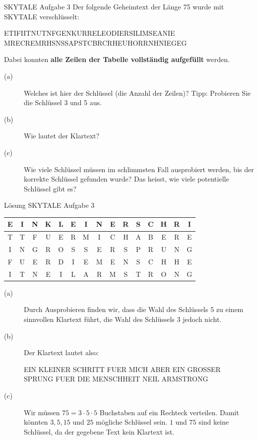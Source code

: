 \begin{frame}[label=skytaleEx3]{SKYTALE Aufgabe 3}
Der folgende Geheimtext der Länge 75 wurde mit SKYTALE verschlüsselt:
\begin{center}
ETIFIITNUTNFGENKURRELEODIERSILIMSEANIE\\
MRECREMRHSNSSAPSTCBRCRHEUHORRNHNIEGEG 
\end{center}
Dabei konnten \textbf{alle Zeilen der Tabelle vollständig aufgefüllt} werden.
\begin{description}
\item[(a)] Welches ist hier der Schlüssel (die Anzahl der Zeilen)? Tipp: Probieren Sie die Schlüssel 3 und 5 aus.
\item[(b)] Wie lautet der Klartext?
\item[(c)] Wie viele Schlüssel müssen im schlimmsten Fall ausprobiert werden, bis der korrekte Schlüssel gefunden wurde? Das heisst, wie viele potentielle Schlüssel gibt es?
\end{description}
\end{frame}

\begin{frame}[fragile, label=skytaleEx3Sol]{Lösung SKYTALE Aufgabe 3}
\begin{table}[]
\begin{tabular}{|c|c|c|c|c|c|c|c|c|c|c|c|c|c|c|}
\hline
E & I & N & K & L & E & I & N & E & R & S & C & H & R & I \\ \hline
T & T & F & U & E & R & M & I & C & H & A & B & E & R & E \\ \hline
I & N & G & R & O & S & S & E & R & S & P & R & U & N & G \\ \hline
F & U & E & R & D & I & E & M & E & N & S & C & H & H & E \\ \hline
I & T & N & E & I & L & A & R & M & S & T & R & O & N & G \\ \hline
\end{tabular}
\end{table}
\begin{description}
\item[(a)] Durch Ausprobieren finden wir, dass die Wahl des Schlüssels 5 zu einem sinnvollen Klartext führt, die Wahl des Schlüssels 3 jedoch nicht.

\item[(b)]
Der Klartext lautet also:
\begin{center}
    {\small
    EIN KLEINER SCHRITT FUER MICH ABER EIN GROSSER\\
    SPRUNG FUER DIE MENSCHHEIT NEIL ARMSTRONG}
\end{center}
\item[(c)] Wir müssen $75=3\cdot 5\cdot 5$ Buchstaben auf ein Rechteck verteilen. Damit könnten $3, 5, 15$ und $25$ mögliche Schlüssel sein. $1$ und $75$ sind keine Schlüssel, da der gegebene Text kein Klartext ist.
\end{description}
\end{frame}


